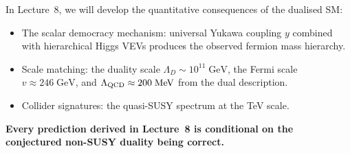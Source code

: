 \documentclass[11pt,a4paper]{article}
\begin{document}
\begin{previewbox}[title={Preview: Lecture 8}]
  In Lecture~8, we will develop the quantitative consequences of the
  dualised SM:
  \begin{itemize}
    \item The scalar democracy mechanism: universal Yukawa coupling $y$
      combined with hierarchical Higgs VEVs produces the observed
      fermion mass hierarchy.
    \item Scale matching: the duality scale
      $\Lambda_D \sim 10^{11}\;\text{GeV}$, the Fermi scale
      $v \approx 246\;\text{GeV}$, and
      $\Lambda_{\mathrm{QCD}} \approx 200\;\text{MeV}$ from the dual
      description.
    \item Collider signatures: the quasi-SUSY spectrum at the TeV scale.
  \end{itemize}

  \textbf{Every prediction derived in Lecture~8 is conditional on
  the conjectured non-SUSY duality being correct.}
\end{previewbox}
\end{document}
